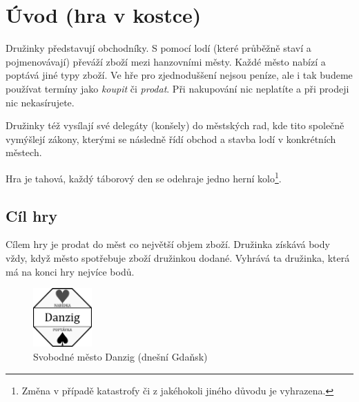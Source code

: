 \documentclass[a4paper, 12pt, twoside]{article}
\begin{document}
\maketitle

\begin{multicols}{2}
\tableofcontents
\end{multicols}

\restoregeometry
\newpage{}

\section{Úvod (hra v kostce)}

Družinky představují obchodníky.  S pomocí lodí (které průběžně staví a pojmenovávají) převáží zboží mezi hanzovními městy.  Každé 
město nabízí a poptává jiné typy zboží.
Ve hře pro zjednoduššení nejsou peníze, ale i tak budeme používat termíny jako \emph{koupit} či \emph{prodat}.  Při nakupování nic neplatíte a při
prodeji nic nekasírujete.

Družinky též vysílají své delegáty (konšely) do městských rad, kde tito společně vymýšlejí zákony, kterými se následně řídí obchod a stavba lodí v konkrétních
městech.

Hra je tahová, každý táborový den se odehraje jedno herní kolo\footnote{Změna v případě katastrofy či z jakéhokoli jiného důvodu je vyhrazena.}. 

\subsection{Cíl hry}

Cílem hry je prodat do měst co největší objem zboží.  Družinka získává body vždy, když město spotřebuje zboží družinkou dodané.  Vyhrává ta družinka, 
která má na konci hry nejvíce bodů.



\begin{figure}
\centering
\includegraphics[width=0.2\textwidth]{figs/danzigG.png}
\caption{Svobodné město Danzig (dnešní Gdaňsk)}
\label{danzig}
\end{figure}
\end{document}
